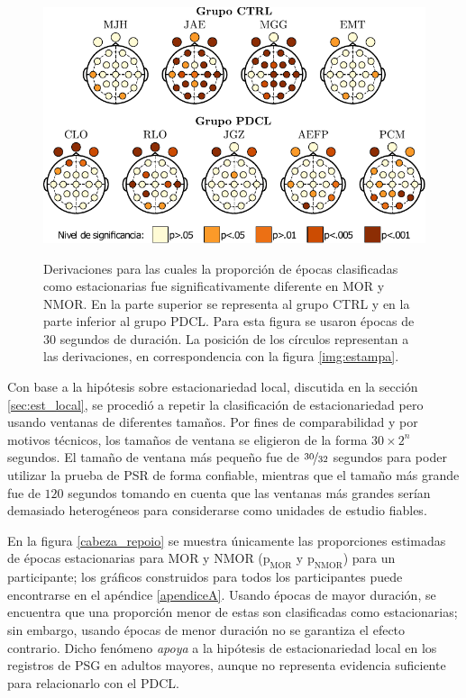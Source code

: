 \documentclass[12pt,letterpaper,draft]{book}
\begin{document}
\begin{figure}
\centering
\includegraphics[width=\textwidth]{./img_art_dfa/prop_tabla.pdf} \\
\caption{Derivaciones para las cuales la proporción de épocas clasificadas como estacionarias fue significativamente diferente en MOR y NMOR.
%
En la parte superior se representa al grupo CTRL y en la parte inferior al grupo PDCL.
%
Para esta figura se usaron épocas de 30 segundos de duración.
%
La posición de los círculos representan a las derivaciones, en correspondencia con la figura \ref{img:estampa}.}
\label{cabeza_new}
\end{figure}

Con base a la hipótesis sobre estacionariedad local, discutida en la sección \ref{sec:est_local}, se procedió a repetir la clasificación de estacionariedad pero usando ventanas de diferentes tamaños.
%
Por fines de comparabilidad y por motivos técnicos, los tamaños de ventana se eligieron de la forma $30 \times 2^{n}$ segundos.
%
El tamaño de ventana más pequeño fue de $\nicefrac{30}{32}$ segundos para poder utilizar la prueba de PSR de forma confiable, mientras que el tamaño más grande fue de $120$ segundos tomando en cuenta que las ventanas más grandes serían demasiado heterogéneos para considerarse como unidades de estudio fiables.

En la figura \ref{cabeza_repoio} se muestra únicamente las proporciones estimadas de épocas estacionarias para MOR y NMOR ($\text{p}_{\text{MOR}}$ y $\text{p}_{\text{NMOR}}$) para un participante; los gráficos construidos para todos los participantes puede encontrarse en el apéndice \ref{apendiceA}.
%
Usando épocas de mayor duración, se encuentra que una proporción menor de estas son clasificadas como estacionarias; sin embargo, usando épocas de menor duración no se garantiza el efecto contrario.
%
Dicho fenómeno \textit{apoya} a la hipótesis de estacionariedad local en los registros de PSG en adultos mayores, aunque no representa evidencia suficiente para relacionarlo con el PDCL.
\end{document}
